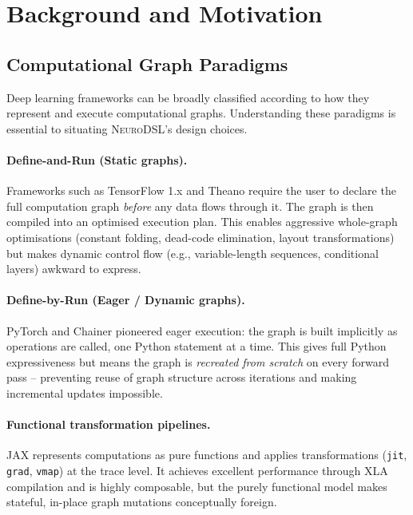 \documentclass{article}
\begin{document}
\section{Background and Motivation}
\label{sec:background}

\subsection{Computational Graph Paradigms}
Deep learning frameworks can be broadly classified according to how they represent and execute computational graphs. Understanding these paradigms is essential to situating \textsc{NeuroDSL}'s design choices.

\paragraph{Define-and-Run (Static graphs).}
Frameworks such as TensorFlow 1.x \cite{tensorflow} and Theano require the user to declare the full computation graph \emph{before} any data flows through it. The graph is then compiled into an optimised execution plan. This enables aggressive whole-graph optimisations (constant folding, dead-code elimination, layout transformations) but makes dynamic control flow (e.g., variable-length sequences, conditional layers) awkward to express.

\paragraph{Define-by-Run (Eager / Dynamic graphs).}
PyTorch \cite{pytorch} and Chainer \cite{chainer} pioneered eager execution: the graph is built implicitly as operations are called, one Python statement at a time. This gives full Python expressiveness but means the graph is \emph{recreated from scratch} on every forward pass -- preventing reuse of graph structure across iterations and making incremental updates impossible.

\paragraph{Functional transformation pipelines.}
JAX \cite{jax} represents computations as pure functions and applies transformations (\texttt{jit}, \texttt{grad}, \texttt{vmap}) at the trace level. It achieves excellent performance through XLA compilation and is highly composable, but the purely functional model makes stateful, in-place graph mutations conceptually foreign.
\end{document}
